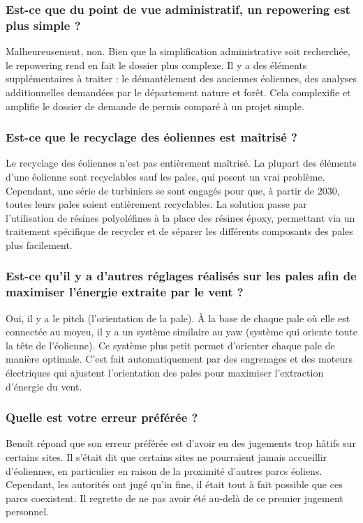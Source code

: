 \subsubsection{Est-ce que du point de vue administratif, un repowering est plus simple ?}

Malheureusement, non. Bien que la simplification administrative soit recherchée, le repowering rend en fait le dossier plus complexe. Il y a des éléments supplémentaires à traiter : le démantèlement des anciennes éoliennes, des analyses additionnelles demandées par le département nature et forêt. Cela complexifie et amplifie le dossier de demande de permis comparé à un projet simple.

\subsubsection{Est-ce que le recyclage des éoliennes est maîtrisé ?}

Le recyclage des éoliennes n'est pas entièrement maîtrisé. La plupart des éléments d'une éolienne sont recyclables sauf les pales, qui posent un vrai problème. Cependant, une série de turbiniers se sont engagés pour que, à partir de 2030, toutes leurs pales soient entièrement recyclables. La solution passe par l'utilisation de résines polyoléfines à la place des résines époxy, permettant via un traitement spécifique de recycler et de séparer les différents composants des pales plus facilement.

\subsubsection{Est-ce qu'il y a d'autres réglages réalisés sur les pales afin de maximiser l'énergie extraite par le vent ?}

Oui, il y a le pitch (l'orientation de la pale). À la base de chaque pale où elle est connectée au moyeu, il y a un système similaire au yaw (système qui oriente toute la tête de l'éolienne). Ce système plus petit permet d'orienter chaque pale de manière optimale. C'est fait automatiquement par des engrenages et des moteurs électriques qui ajustent l'orientation des pales pour maximiser l'extraction d'énergie du vent.

\subsubsection{Quelle est votre erreur préférée ?}

Benoît répond que son erreur préférée est d'avoir eu des jugements trop hâtifs sur certains sites. Il s'était dit que certains sites ne pourraient jamais accueillir d'éoliennes, en particulier en raison de la proximité d'autres parcs éoliens. Cependant, les autorités ont jugé qu'in fine, il était tout à fait possible que ces parcs coexistent. Il regrette de ne pas avoir été au-delà de ce premier jugement personnel.

